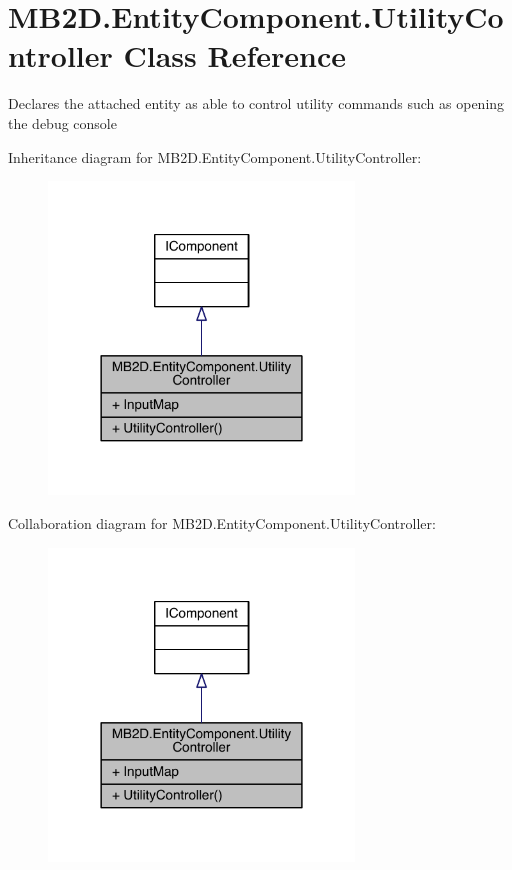 \hypertarget{class_m_b2_d_1_1_entity_component_1_1_utility_controller}{}\section{M\+B2\+D.\+Entity\+Component.\+Utility\+Controller Class Reference}
\label{class_m_b2_d_1_1_entity_component_1_1_utility_controller}


Declares the attached entity as able to control utility commands such as opening the debug console  




Inheritance diagram for M\+B2\+D.\+Entity\+Component.\+Utility\+Controller\+:\nopagebreak
\begin{figure}[H]
\begin{center}
\leavevmode
\includegraphics[width=230pt]{class_m_b2_d_1_1_entity_component_1_1_utility_controller__inherit__graph}
\end{center}
\end{figure}


Collaboration diagram for M\+B2\+D.\+Entity\+Component.\+Utility\+Controller\+:\nopagebreak
\begin{figure}[H]
\begin{center}
\leavevmode
\includegraphics[width=230pt]{class_m_b2_d_1_1_entity_component_1_1_utility_controller__coll__graph}
\end{center}
\end{figure}
